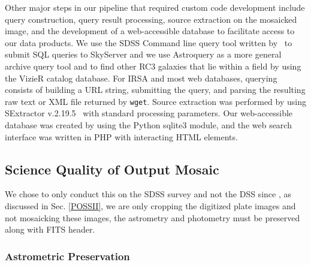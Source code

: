 \documentclass[authoryear, 12pt, 5p, times]{elsarticle}
\begin{document}
Other major steps in our pipeline that required custom code development include query construction, query result processing, source extraction on the mosaicked image, and the development of a web-accessible database to facilitate access to our data products. We use the SDSS Command line query tool written by~\cite{sqlclref}  to submit SQL queries to SkyServer and we use Astroquery as a more general archive query tool and to find other RC3 galaxies that lie within a field by using the VizieR catalog database. For IRSA and most web databases, querying consists of building a URL string, submitting the query, and parsing the resulting  raw text or XML file returned by \texttt{wget}. Source extraction was performed by using SExtractor v.2.19.5~\citep{sextractor} with standard processing parameters. Our web-accessible database was created by using the Python sqlite3 module, and the web search interface was written in PHP with interacting HTML elements.
\subsection{Science Quality of Output Mosaic\label{preserved}}
We chose to only conduct this on the SDSS survey and not the DSS since 
, as discussed in Sec. \ref{POSSII}, we are only cropping the digitized plate images and not mosaicking these images, the astrometry and photometry must be preserved along with FITS header.
\subsubsection{Astrometric Preservation}
\end{document}
